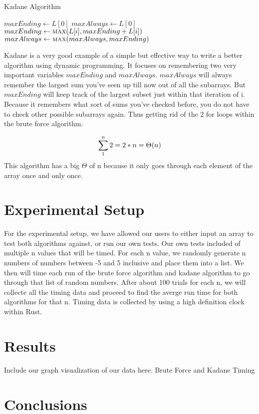 \documentclass[10pt, letterpaper]{article}
\begin{document}
  \begin{algorithm}
		\caption{Kadane Algorithm}\label{kadane}
	\begin{algorithmic}
    \State $maxEnding \gets L[0]$
    \State $maxAlways \gets L[0]$
    \State $maxEnding \gets \Call{max}{L[i], maxEnding + L[i]}$
    \State $maxAlways \gets \Call{max}{maxAlways, maxEnding}$
    \EndFor
	  \EndFunction
	\end{algorithmic}
	\end{algorithm}
  Kadane is a very good example of a simple but effective way to write a better algorithm using dynamic programming. It focuses on remembering two very important variables $maxEnding$ and $maxAlways$. $maxAlways$ will always remember the largest sum you've seen up till now out of all the subarrays. But $maxEnding$ will keep track of the largest subset just within that iteration of i. Because it remembers what sort of sums you've checked before, you do not have to check other possible subarrays again. Thus getting rid of the 2 for loops within the brute force algorithm.

  \[
  \sum_1^n2 \\
  = 2 * n \\
  = \Theta(n)
		\]
	This algorithm has a big $\Theta$ of n because it only goes through each element of the array once and only once.
	\section{Experimental Setup}
	For the experimental setup, we have allowed our users to either input an array to test both algorithms against, or run our own tests.
  Our own tests included of multiple n values that will be timed. For each n value, we randomly generate n numbers of numbers between -5 and 5 inclusive and place them into a list. We then will time each run of the brute force algorithm and kadane algorithm to go through that list of random numbers. After about 100 trials for each n, we will collecte all the timing data and proceed to find the averge run time for both algorithms for that n.
  Timing data is collected by using a high definition clock within Rust.
	\section{Results}
	Include our graph visualization of our data here. Brute Force and Kadane Timing

	\section{Conclusions}
\end{document}
